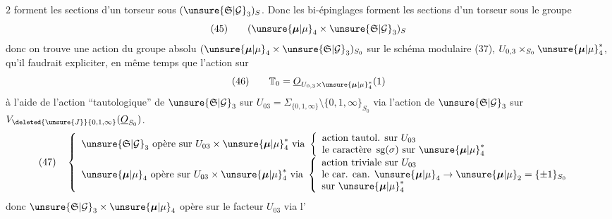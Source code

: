 $2$ forment les sections d'un torseur sous $(\unsure{\mathfrak{S}|\mathcal G}_3)_S$. Donc les bi-épinglages forment les sections d'un torseur sous le groupe 
\[
(45)\qquad(\unsure{\boldsymbol{\mu}|\mu}_4\times\unsure{\mathfrak{S}|\mathcal G}_3)_S
\]
donc on trouve une action du groupe absolu $(\unsure{\boldsymbol{\mu}|\mu}_4\times\unsure{\mathfrak{S}|\mathcal G}_3)_{S_0}$ sur  le schéma modulaire (37), $U_{0,3}\times_{S_0}\unsure{\boldsymbol{\mu}|\mu}_4^*$, qu'il faudrait expliciter, en même temps que l'action sur
\[
(46)\qquad\mathbb{T}_0=\underline{O}_{U_{0,3}\times\unsure{\boldsymbol{\mu}|\mu}_4^*}(1)
\]
à l'aide de l'action ``tautologique'' de $\unsure{\mathfrak{S}|\mathcal G}_3$ sur  $U_{03}=\Sigma_{\{0,1,\infty\}}\setminus\{0,1,\infty\}_{S_0}$ via l'action de $\unsure{\mathfrak{S}|\mathcal G}_3$ sur $V_{\deleted{\unsure{J}}\{0,1,\infty\}}(\underline{O}_{S_0})$.
\[
(47)\quad\left\{\begin{array}{l}
\unsure{\mathfrak{S}|\mathcal G}_3\text{ opère sur }U_{03}\times\unsure{\boldsymbol{\mu}|\mu}_4^*\text{ via }\left\{\begin{array}{l}\text{action tautol. sur }U_{03}\\\text{le caractère }\operatorname{sg}(\sigma)\text{ sur }\unsure{\boldsymbol{\mu}|\mu}_4^*\end{array}\right.\\[7pt]
\unsure{\boldsymbol{\mu}|\mu}_4\text{ opère sur }U_{03}\times\unsure{\boldsymbol{\mu}|\mu}_4^*\text{ via }\left\{\begin{array}{l}\text{action triviale sur }U_{03}\\\text{le car. can. }\unsure{\boldsymbol{\mu}|\mu}_4\to\unsure{\boldsymbol{\mu}|\mu}_2=\{\pm1\}_{S_0}\\\text{sur }\unsure{\boldsymbol{\mu}|\mu}_4^*\end{array}\right.
\end{array}\right.
\]
donc $\unsure{\mathfrak{S}|\mathcal G}_3\times\unsure{\boldsymbol{\mu}|\mu}_4$ opère sur le facteur $U_{03}$ via l'


